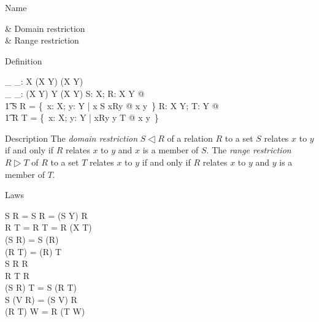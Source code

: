 \begin{manpage}\label{p:1040}
\item[Name]
\begin{name}
       \dres & Domain restriction%
		\symdex{$\dres$} \\
       \rres & Range restriction%
		\symdex{$\rres$}
\end{name}

\item[Definition]
\begin{gendef}[X,Y]
        \_ \dres \_: \power X \cross (X \rel Y) \fun (X \rel Y) \\
        \_ \rres \_: (X \rel Y) \cross \power Y \fun (X \rel Y)
\where
        \forall S: \power X; R: X \rel Y @ \\
\t1         S \dres R = \{~x: X; y: Y |
		x \in S \land \reln xRy @ x \mapsto y~\}
\also
        \forall R: X \rel Y; T: \power Y @ \\
\t1         R \rres T = \{~x: X; y: Y |
		\reln xRy \land y \in T @ x \mapsto y~\}
\end{gendef}

\item[Description]
The {\em domain restriction\/} $S \dres R$ of a relation $R$ to
a set $S$ relates $x$ to $y$ if and only if $R$ relates $x$ to
$y$ and $x$ is a member of $S$. The {\em range restriction\/}
$R \rres T$ of $R$ to a set $T$ relates $x$ to $y$ if and only
if $R$ relates $x$ to $y$ and $y$ is a member of $T$.

\item[Laws]
\begin{laws}
     S \dres R = \id S \comp R = (S \cross Y) \cap R \\
     R \rres T = R \comp \id T = R \cap (X \cross T) \\
\also
     \dom (S \dres R) = S \cap (\dom R) \\
     \ran (R \rres T) = (\ran R) \cap T \\
\also
     S \dres R \subseteq R \\
     R \rres T \subseteq R \\
\also
     (S \dres R) \rres T = S \dres (R \rres T) \\
     S \dres (V \dres R) = (S \cap V) \dres R \\
     (R \rres T) \rres W = R \rres (T \cap W)
\end{laws}
\end{manpage}
